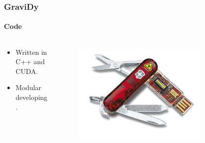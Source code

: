 \begin{frame}
    \frametitle{GraviDy}
    \framesubtitle{Code}
    \begin{columns}
        \begin{column}{0.5\textwidth}
            \begin{itemize}
                \item Written in C++ and CUDA.
                \item Modular developing.
            \end{itemize}
        \end{column}
        \begin{column}{0.5\textwidth}
            \begin{figure}
                \centering
                \label{fig:navaja}
                \includegraphics[width=0.8\textwidth]{img/navaja}
            \end{figure}
        \end{column}
    \end{columns}
\end{frame}


